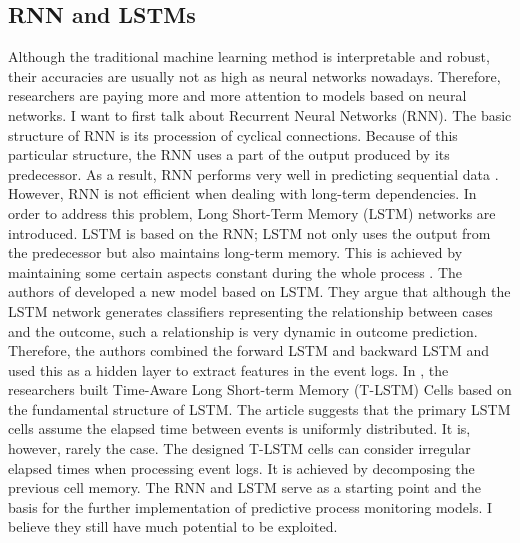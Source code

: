 \documentclass[runningheads]{llncs}
\begin{document}
		\subsection{RNN and LSTMs}
		Although the traditional machine learning method is interpretable and robust, their accuracies are usually not as high as neural networks nowadays. Therefore, researchers are paying more and more attention to models based on neural networks. I want to first talk about Recurrent Neural Networks (RNN). The basic structure of RNN is its procession of cyclical connections. Because of this particular structure, the RNN uses a part of the output produced by its predecessor. As a result, RNN performs very well in predicting sequential data \cite{art-21}. However, RNN is not efficient when dealing with long-term dependencies. In order to address this problem, Long Short-Term Memory (LSTM) networks are introduced. LSTM is based on the RNN; LSTM not only uses the output from the predecessor but also maintains long-term memory. This is achieved by maintaining some certain aspects constant during the whole process \cite{art-21}. The authors of \cite{art-9} developed a new model based on LSTM. They argue that although the LSTM network generates classifiers representing the relationship between cases and the outcome, such a relationship is very dynamic in outcome prediction. Therefore, the authors combined the forward LSTM and backward LSTM and used this as a hidden layer to extract features in the event logs. In \cite{art-14}, the researchers built Time-Aware Long Short-term Memory (T-LSTM) Cells based on the fundamental structure of LSTM. The article suggests that the primary LSTM cells assume the elapsed time between events is uniformly distributed. It is, however, rarely the case. The designed T-LSTM cells can consider irregular elapsed times when processing event logs. It is achieved by decomposing the previous cell memory. The RNN and LSTM serve as a starting point and the basis for the further implementation of predictive process monitoring models. I believe they still have much potential to be exploited.     
	
\end{document}
